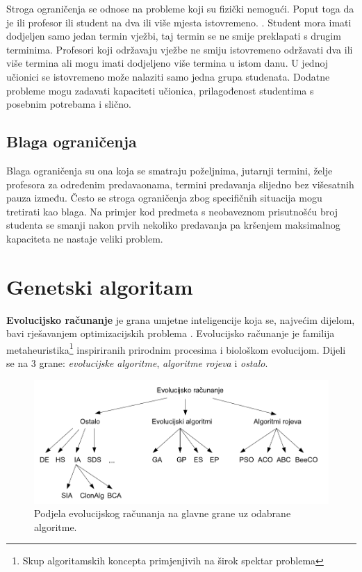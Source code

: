 \documentclass[times, utf8, zavrsni]{fer}
\begin{document}
Stroga ograničenja se odnose na probleme koji su fizički nemogući. Poput toga da je ili profesor ili student na dva ili više mjesta istovremeno. \citep{herath2017genetic}. Student mora imati dodjeljen samo jedan termin vježbi, taj termin se ne smije preklapati s drugim terminima. Profesori koji održavaju vježbe ne smiju istovremeno održavati dva ili više termina ali mogu imati dodjeljeno više termina u istom danu. U jednoj učionici se istovremeno može nalaziti samo jedna grupa studenata. Dodatne probleme mogu zadavati kapaciteti učionica, prilagođenost studentima s posebnim potrebama i slično.

\section{Blaga ograničenja}
Blaga ograničenja su ona koja se smatraju poželjnima, jutarnji termini, želje profesora za određenim predavaonama, termini predavanja slijedno bez višesatnih pauza između. Često se stroga ograničenja zbog specifičnih situacija mogu tretirati kao blaga. Na primjer kod predmeta s neobaveznom prisutnošću broj studenta se smanji nakon prvih nekoliko predavanja pa kršenjem maksimalnog kapaciteta ne nastaje veliki problem.

\chapter{Genetski algoritam}
\textbf{Evolucijsko računanje} je grana umjetne inteligencije koja se, najvećim dijelom, bavi rješavanjem optimizacijskih problema \citep{cupic-disertacija}. Evolucijsko računanje je familija metaheuristika\footnote{Skup algoritamskih koncepta primjenjivih na širok spektar problema} inspiriranih prirodnim procesima i biološkom evolucijom. Dijeli se na  3 grane: \emph{evolucijske algoritme}, \emph{algoritme rojeva} i \emph{ostalo}. 

\begin{figure}[htb]
\centering
\includegraphics[width=15cm]{images/evolucijske_grane.png}
\caption{Podjela evolucijskog računanja na glavne grane uz odabrane algoritme. \citep{cupic-disertacija}}
\label{fig:evolucijske_grane}
\end{figure}
\end{document}
